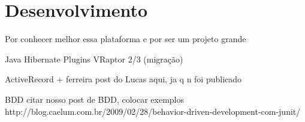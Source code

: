\section{Desenvolvimento}

Por conhecer melhor essa plataforma e por ser um projeto grande

Java
Hibernate
Plugins
VRaptor 2/3 (migração)

ActiveRecord + ferreira
post do Lucas aqui, ja q n foi publicado

BDD
citar nosso post de BDD, colocar exemplos
http://blog.caelum.com.br/2009/02/28/behavior-driven-development-com-junit/


